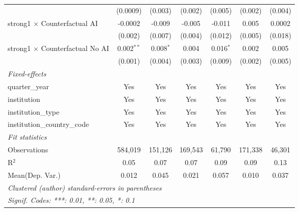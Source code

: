 \begin{tabular}{lcccccc}
                                          & (0.0009)       & (0.003)        & (0.002)        & (0.005)        & (0.002)        & (0.004)\\   
   strong1 $\times$ Counterfactual AI     & -0.0002        & -0.009         & -0.005         & -0.011         & 0.005          & 0.0002\\   
                                          & (0.002)        & (0.007)        & (0.004)        & (0.012)        & (0.005)        & (0.018)\\   
   strong1 $\times$ Counterfactual No AI  & 0.002$^{**}$   & 0.008$^{*}$    & 0.004          & 0.016$^{*}$    & 0.002          & 0.005\\   
                                          & (0.001)        & (0.004)        & (0.003)        & (0.009)        & (0.002)        & (0.005)\\   
   \midrule
   \emph{Fixed-effects}\\
   quarter\_year                          & Yes            & Yes            & Yes            & Yes            & Yes            & Yes\\  
   institution                            & Yes            & Yes            & Yes            & Yes            & Yes            & Yes\\  
   institution\_type                      & Yes            & Yes            & Yes            & Yes            & Yes            & Yes\\  
   institution\_country\_code             & Yes            & Yes            & Yes            & Yes            & Yes            & Yes\\  
   \midrule
   \emph{Fit statistics}\\
   Observations                           & 584,019        & 151,126        & 169,543        & 61,790         & 171,338        & 46,301\\  
   R$^2$                                  & 0.05           & 0.07           & 0.07           & 0.09           & 0.09           & 0.13\\  
Mean(Dep. Var.) & 0.012 & 0.045 & 0.021 & 0.057 & 0.010 & 0.037 \\
   \midrule \midrule
   \multicolumn{7}{l}{\emph{Clustered (author) standard-errors in parentheses}}\\
   \multicolumn{7}{l}{\emph{Signif. Codes: ***: 0.01, **: 0.05, *: 0.1}}\\
\end{tabular}
\par\endgroup
